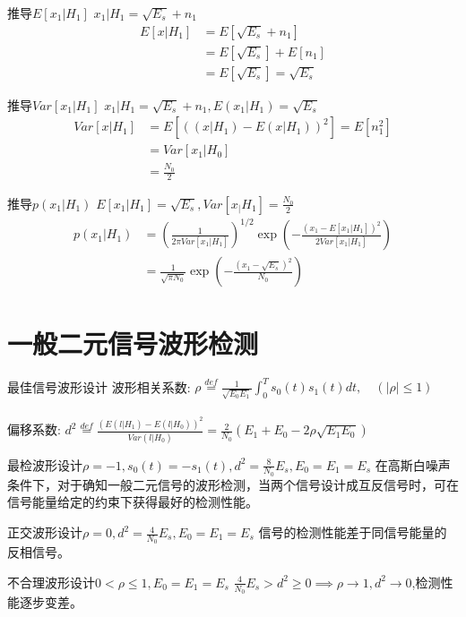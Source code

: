 \begin{frame}{推导$E[x_1|H_1]$}
$x_1|H_1=\sqrt{E_s}+n_1$
\begin{align*}
E[x|H_1]&=E\left[\sqrt{E_s}+n_1\right]\\
&=E[\sqrt{E_s}]+E[n_1]\\
&=E[\sqrt{E_s}]=\sqrt{E_s}
\end{align*}
\end{frame}

\begin{frame}{推导$Var[x_1|H_1]$}
$x_1|H_1=\sqrt{E_s}+n_1,E(x_1|H_1)=\sqrt{E_s}$
\begin{align*}
Var[x|H_1]&=E[((x|H_1)-E(x|H_1))^2]=E[n_1^2]\\
&=Var[x_1|H_0]\\
&=\frac{N_0}{2}
\end{align*}
\end{frame}

\begin{frame}{推导$p(x_1|H_1)$}
$E[x_1|H_1]=\sqrt{E_s},Var[x_|H_1]=\frac{N_0}{2}$
\begin{align*}
p(x_1|H_1)&=\left(\frac{1}{2\pi Var[x_1|H_1]}\right)^{1/2}\exp\left(-\frac{(x_1-E[x_1|H_1])^2}{2Var[x_1|H_1]}\right)\\
&=\frac{1}{\sqrt{\pi N_0}}\exp\left(-\frac{(x_1-\sqrt{E_s})^2}{N_0}\right)
\end{align*}
\end{frame}

\section{一般二元信号波形检测}

\begin{frame}{最佳信号波形设计}
波形相关系数: $\rho\mathop{=}\limits^{def}\frac{1}{\sqrt{E_{0}E_{1}}}\int_{0}^{T}s_0(t)s_1(t)dt,\quad(|\rho|\le 1)$\\
~\\
偏移系数: $d^2\mathop{=}\limits^{def}\frac{(E(l|H_1)-E(l|H_0))^2}{Var(l|H_0)}=\frac{2}{N_0}(E_1+E_0-2\rho\sqrt{E_1E_0})$
\begin{block}{最检波形设计$\rho=-1,s_0(t)=-s_1(t),d^2=\frac{8}{N_0}E_s,E_0=E_1=E_s$}
	在高斯白噪声条件下，对于确知一般二元信号的波形检测，当两个信号设计成互反信号时，可在信号能量给定的约束下获得最好的检测性能。
\end{block}
\begin{block}{正交波形设计$\rho=0,d^2=\frac{4}{N_0}E_s,E_0=E_1=E_s$}
	信号的检测性能差于同信号能量的反相信号。
\end{block}
\begin{block}{不合理波形设计$0<\rho\le 1,E_0=E_1=E_s$}
	$\frac{4}{N_0}E_s>d^2\ge 0\implies\rho\to 1,d^2\to 0$,检测性能逐步变差。
\end{block}
\end{frame}

